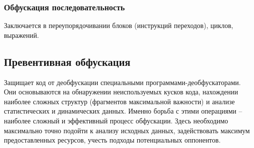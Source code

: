 \subsubsection{Обфускация последовательность}
Заключается в переупорядочивании блоков (инструкций переходов), циклов, выражений. 

\subsection{Превентивная обфускация}

Защищает код от деобфускации специальными программами-деобфускаторами. Они основываются на обнаружении неиспользуемых кусков кода, нахождении наиболее сложных структур (фрагментов максимальной важности) и анализе статистических и динамических данных. Именно борьба с этими операциями -- наиболее сложный и эффективный процесс обфускации. Здесь необходимо максимально точно подойти к анализу исходных данных, задействовать максимум предоставленных ресурсов, учесть подходы потенциальных оппонентов.